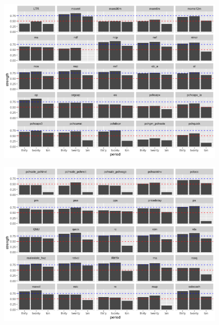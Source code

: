 \begin{landscape}
	\begin{figure}[ht]
		\includegraphics[scale = 0.75]{strength_comparison_IV}
		\centering
	\end{figure}
\end{landscape}

\begin{landscape}
	\begin{figure}[ht]
		\includegraphics[scale = 0.75]{strength_comparison_V}
		\centering
	\end{figure}
\end{landscape}

